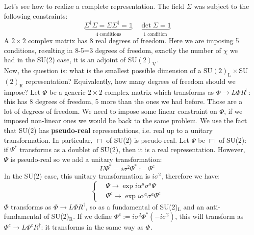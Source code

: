 \documentclass[../main.tex]{subfiles}
\begin{document}
Let's see how to realize a complete representation. The field $\Sigma$ was subject to the following constraints:
\[
\underbrace{\Sigma^\dagger\Sigma=\Sigma\Sigma^\dagger=\mathbb{1}}_{\text{4 conditions}} \quad \underbrace{\det\Sigma=1}_{\text{1 condition}}
\]
A $2\times2$ complex matrix has 8 real degrees of freedom. Here we are imposing 5 conditions, resulting in 8-5=3 degrees of freedom, exactly the number of $\chi$ we had in the SU(2) case, it is an adjoint of SU$(2)_{\text{V}}$.\\
Now, the question is: what is the smallest possible dimension of a SU$(2)_{\text{L}}\times$SU$(2)_{\text{R}}$ representation? Equivalently, how many degrees of freedom should we impose? Let $\Phi$ be a generic $2\times2$ complex matrix which transforms as $\Phi\to L\Phi R^\dagger$: this has 8 degrees of freedom, 5 more than the ones we had before. Those are a lot of degrees of freedom. We need to impose some linear constraint on $\Phi$, if we imposed non-linear ones we would be back to the same problem. We use the fact that SU(2) has \textbf{pseudo-real} representations, i.e. real up to a unitary transformation. In particular, $\Box$ of SU(2) is pseudo-real. Let $\Psi$ be $\Box$ of SU(2): if $\Psi^*$ transforms as a doublet of SU(2), then it is a real representation. However, $\Psi$ is pseudo-real so we add a unitary transformation:
\[
U\Psi^*=i\sigma^2\Psi^*:=\Psi^c
\]
In the SU(2) case, this unitary transformation is $i\sigma^2$, therefore we have:
\[
\left\{
\begin{aligned}
&\Psi\to\exp{i\alpha^a\sigma^a}\Psi\\
&\Psi^c\to\exp{i\alpha^a\sigma^a}\Psi^c
\end{aligned}
\right.
\]
$\Phi$ transforms as $\Phi\to L\Phi R^\dagger$, so as a fundamental of SU(2)$_{\text{L}}$ and an anti-fundamental of SU(2)$_{\text{R}}$. If we define $\Phi^c:=i\sigma^2\Phi^*(-i\sigma^2)$, this will transform as $\Phi^c\to L\Phi^c R^\dagger$: it transforms in the same way as $\Phi$.\\
\end{document}
